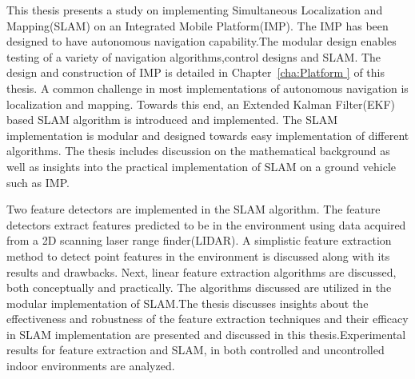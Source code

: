{}
{

This thesis presents a study on implementing Simultaneous Localization and Mapping(SLAM) on an Integrated Mobile Platform(IMP). The IMP has been designed to have autonomous navigation capability.The modular design enables testing of a variety of navigation algorithms,control designs and SLAM. The design and construction of IMP is detailed in Chapter~\ref{cha:Platform } of this thesis. A common challenge in most implementations of autonomous navigation is localization and mapping. Towards this end, an Extended Kalman Filter(EKF) based SLAM algorithm is introduced and implemented. The SLAM implementation is modular and designed towards easy implementation of different algorithms. The thesis includes discussion on the mathematical background as well as insights into the practical implementation of SLAM on a ground vehicle such as IMP. 

Two feature detectors are implemented in the SLAM algorithm. The feature detectors extract features predicted to be in the environment using data acquired from a 2D scanning laser range finder(LIDAR). A simplistic feature extraction method to detect point features in the environment is discussed along with its results and drawbacks. Next, linear feature extraction algorithms are discussed, both conceptually and practically. The algorithms discussed are utilized in the modular implementation of SLAM.The thesis discusses insights about the effectiveness and robustness of the feature extraction techniques and their efficacy in SLAM implementation are presented and discussed in this thesis.Experimental results for feature extraction and SLAM, in both controlled and uncontrolled indoor environments are analyzed.
}
{\endmsabstract}